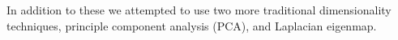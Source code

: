 In addition to these we attempted to use two more traditional dimensionality techniques, principle component analysis (PCA), and Laplacian eigenmap. 





